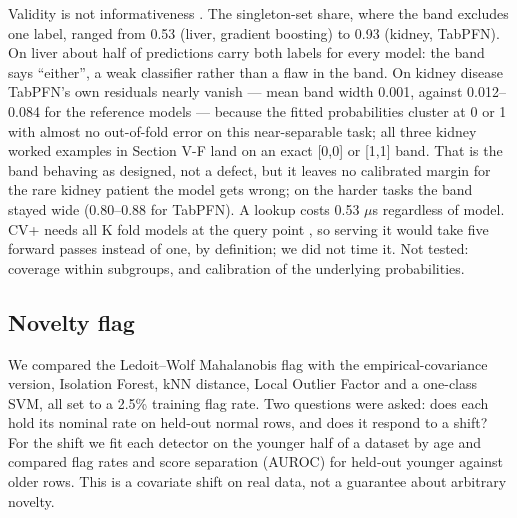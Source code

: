 \documentclass[conference]{IEEEtran}
\begin{document}
Validity is not informativeness \cite{angelopoulos2021}. The singleton-set share, where the band excludes one label, ranged from 0.53 (liver, gradient boosting) to 0.93 (kidney, TabPFN). On liver about half of predictions carry both labels for every model: the band says ``either'', a weak classifier rather than a flaw in the band. On kidney disease TabPFN's own residuals nearly vanish --- mean band width 0.001, against 0.012--0.084 for the reference models --- because the fitted probabilities cluster at 0 or 1 with almost no out-of-fold error on this near-separable task; all three kidney worked examples in Section V-F land on an exact [0,0] or [1,1] band. That is the band behaving as designed, not a defect, but it leaves no calibrated margin for the rare kidney patient the model gets wrong; on the harder tasks the band stayed wide (0.80--0.88 for TabPFN). A lookup costs 0.53 $\mu$s regardless of model. CV+ needs all K fold models at the query point \cite{barber2021}, so serving it would take five forward passes instead of one, by definition; we did not time it. Not tested: coverage within subgroups, and calibration of the underlying probabilities.

\subsection{Novelty flag}

We compared the Ledoit--Wolf Mahalanobis flag with the empirical-covariance version, Isolation Forest, kNN distance, Local Outlier Factor and a one-class SVM, all set to a 2.5\% training flag rate. Two questions were asked: does each hold its nominal rate on held-out normal rows, and does it respond to a shift? For the shift we fit each detector on the younger half of a dataset by age and compared flag rates and score separation (AUROC) for held-out younger against older rows. This is a covariate shift on real data, not a guarantee about arbitrary novelty.
\end{document}
